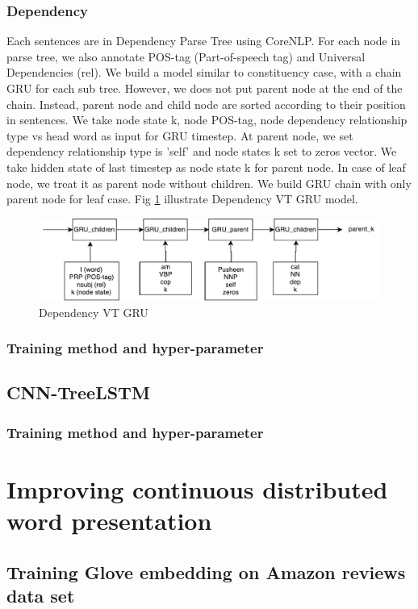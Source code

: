 \subsubsection{Dependency}
Each sentences are in Dependency Parse Tree using CoreNLP. For each node in parse tree, we also annotate POS-tag (Part-of-speech tag) and Universal Dependencies (rel).
We build a model similar to constituency case, with a chain GRU for each sub tree. However, we does not put parent node at the end of the chain. Instead, parent node and child node are sorted according to their position in sentences. We take node state k, node POS-tag, node dependency relationship type vs head word as input for GRU timestep. At parent node, we set dependency relationship type is 'self' and node states k set to zeros vector. We take hidden state of last timestep as node state k for parent node. In case of leaf node, we treat it as parent node without children. We build GRU chain with only parent node for leaf case. Fig \ref{fig:dependencyvtgru} illustrate Dependency VT GRU model.

\begin{figure}[h]
	\centering
	\includegraphics[width=0.5\linewidth]{figure/dependencyvtgru}
	\caption[Dependency VT GRU]{Dependency VT GRU}
	\label{fig:dependencyvtgru}
\end{figure}

\subsubsection{Training method and hyper-parameter}

\subsection{CNN-TreeLSTM}\label{sec:CNNtree}
\subsubsection{Training method and hyper-parameter}


\section{Improving continuous distributed word presentation}

\subsection{Training Glove embedding on Amazon reviews data set}

